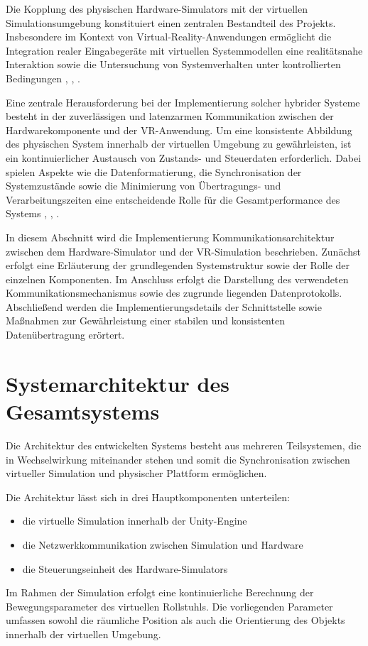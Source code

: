 Die Kopplung des physischen Hardware-Simulators mit der virtuellen Simulationsumgebung konstituiert einen zentralen Bestandteil des Projekts. Insbesondere im Kontext von Virtual-Reality-Anwendungen ermöglicht die Integration realer Eingabegeräte mit virtuellen Systemmodellen eine realitätsnahe Interaktion sowie die Untersuchung von Systemverhalten unter kontrollierten Bedingungen \cite{Jason2015}, \cite{Bowman2004}, \cite{Perez2025}.

Eine zentrale Herausforderung bei der Implementierung solcher hybrider Systeme besteht in der zuverlässigen und latenzarmen Kommunikation zwischen der Hardwarekomponente und der VR-Anwendung. Um eine konsistente Abbildung des physischen System innerhalb der virtuellen Umgebung zu gewährleisten, ist ein kontinuierlicher Austausch von Zustands- und Steuerdaten erforderlich. Dabei spielen Aspekte wie die Datenformatierung, die Synchronisation der Systemzustände sowie die Minimierung von Übertragungs- und Verarbeitungszeiten eine entscheidende Rolle für die Gesamtperformance des Systems \cite{Coppik}, \cite{Cleland2022}, \cite{Alam2025}.

In diesem Abschnitt wird die Implementierung Kommunikationsarchitektur zwischen dem Hardware-Simulator und der VR-Simulation beschrieben. Zunächst erfolgt eine Erläuterung der grundlegenden Systemstruktur sowie der Rolle der einzelnen Komponenten. Im Anschluss erfolgt die Darstellung des verwendeten Kommunikationsmechanismus sowie des zugrunde liegenden Datenprotokolls. Abschließend werden die Implementierungsdetails der Schnittstelle sowie Maßnahmen zur Gewährleistung einer stabilen und konsistenten Datenübertragung erörtert. 

\section{Systemarchitektur des Gesamtsystems}
Die Architektur des entwickelten Systems besteht aus mehreren Teilsystemen, die in Wechselwirkung miteinander stehen und somit die Synchronisation zwischen virtueller Simulation und physischer Plattform ermöglichen.

Die Architektur lässt sich in drei Hauptkomponenten unterteilen:
\begin{itemize}
        \item die virtuelle Simulation innerhalb der Unity-Engine
        \item die Netzwerkkommunikation zwischen Simulation und Hardware
        \item die Steuerungseinheit des Hardware-Simulators
\end{itemize}
Im Rahmen der Simulation erfolgt eine kontinuierliche Berechnung der Bewegungsparameter des virtuellen Rollstuhls. Die vorliegenden Parameter umfassen sowohl die räumliche Position als auch die Orientierung des Objekts innerhalb der virtuellen Umgebung.

